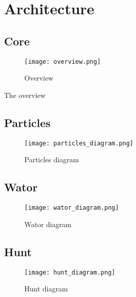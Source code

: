 \section{Architecture}
\label{sec:arch}

\subsection{Core}
\begin{figure}[H]
   \texttt{[image: overview.png]}
   \caption{Overview}
\end{figure}

The overview
\newpage

\subsection{Particles}
\begin{figure}[H]
   \texttt{[image: particles\_diagram.png]}
   \caption{Particles diagram}
\end{figure}
\newpage

\subsection{Wator}
\begin{figure}[H]
   \texttt{[image: wator\_diagram.png]}
   \caption{Wator diagram}
\end{figure}
\newpage

\subsection{Hunt}
\begin{figure}[H]
   \texttt{[image: hunt\_diagram.png]}
   \caption{Hunt diagram}
\end{figure}

\newpage